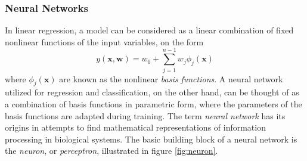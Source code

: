 \subsubsection{Neural Networks}
In linear regression, a model can be considered as a linear combination of fixed nonlinear functions of the input variables, on the form
\begin{equation}
y(\mathbf{x,w})=w_0+\sum_{j=1}^{n-1}w_j\phi_j(\mathbf{x})
\end{equation}
where $\phi_j(\mathbf{x})$ are known as the nonlinear \textit{basis functions}. A neural network utilized for regression and classification, on the other hand, can be thought of as a combination of basis functions in parametric form, where the parameters of the basis functions are adapted during training. The term \textit{neural network} has its origins in attempts to find mathematical representations of information processing in biological systems. The basic building block of a neural network is the \textit{neuron}, or \textit{perceptron}, illustrated in figure \ref{fig:neuron}.
